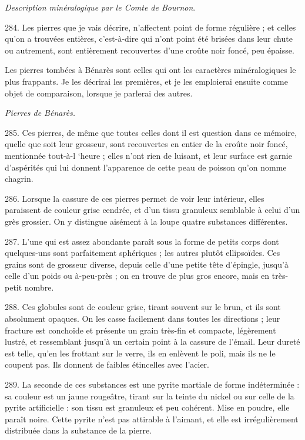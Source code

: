 \documentclass[a4paper, 11pt, oneside, polutonikogreek, french]{article}
\begin{document}
\emph{Description minéralogique par le Comte de Bournon}.

284. \og Les pierres que je vais décrire, n'affectent point de forme régulière ; et celles qu'on a trouvées entières, c'est-à-dire qui n'ont point été brisées dans leur chute ou autrement, sont entièrement recouvertes d'une croûte noir foncé, peu épaisse.

Les pierres tombées à Bénarès sont celles qui ont les caractères minéralogiques le plus frappants. Je les décrirai les premières, et je les emploierai ensuite comme objet de comparaison, lorsque je parlerai des autres.

\emph{Pierres de Bénarès.}

285. Ces pierres, de même que toutes celles dont il est question dans ce mémoire, quelle que soit leur grosseur, sont recouvertes en entier de la croûte noir foncé, mentionnée tout-à-l ‘heure ; elles n'ont rien de luisant, et leur surface est garnie d'aspérités qui lui donnent l'apparence de cette peau de poisson qu'on nomme chagrin.

286. Lorsque la cassure de ces pierres permet de voir leur intérieur, elles paraissent de couleur grise cendrée, et d'un tissu granuleux semblable à celui d'un grès grossier. On y distingue aisément à la loupe quatre substances différentes.

287. L'une qui est assez abondante paraît sous la forme de petits corps dont quelques-uns sont parfaitement sphériques ; les autres plutôt ellipsoïdes. Ces grains sont de grosseur diverse, depuis celle d'une petite tête d'épingle, jusqu'à celle d'un poids ou à-peu-près ; on en trouve de plus gros encore, mais en très-petit nombre.

288. Ces globules sont de couleur grise, tirant souvent sur le brun, et ils sont absolument opaques. On les casse facilement dans toutes les directions ; leur fracture est conchoïde et présente un grain très-fin et compacte, légèrement lustré, et ressemblant jusqu'à un certain point à la cassure de l'émail. Leur dureté est telle, qu'en les frottant sur le verre, ils en enlèvent le poli, mais ils ne le coupent pas. Ils donnent de faibles étincelles avec l'acier.

289. La seconde de ces substances est une pyrite martiale de forme indéterminée : sa couleur est un jaune rougeâtre, tirant sur la teinte du nickel ou sur celle de la pyrite artificielle : son tissu est granuleux et peu cohérent. Mise en poudre, elle paraît noire. Cette pyrite n'est pas attirable à l'aimant, et elle est irrégulièrement distribuée dans la substance de la pierre.
\end{document}
